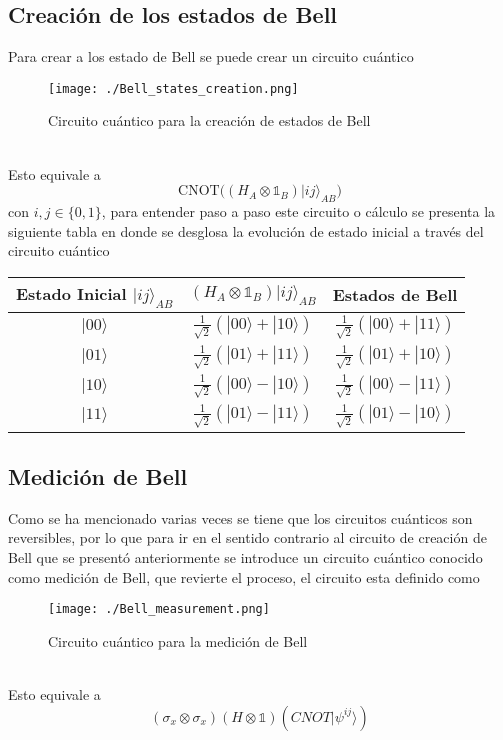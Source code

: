 \documentclass[a4paper]{article}
\begin{document}
\subsection{Creación de los estados de Bell}
Para crear a los estado de Bell se puede crear un circuito cuántico
\begin{figure}[h]
\begin{center}
\texttt{[image: ./Bell\_states\_creation.png]} 
\end{center} 
\caption{Circuito cuántico para la creación de estados de Bell}
\label{fig::NOT_gate}
\end{figure}\\
Esto equivale a 
\begin{equation}
\text{CNOT}\bigg((H_A\otimes\mathbb{1}_B)|ij\rangle_{AB} \bigg)
\end{equation}
con $i,j\in\{0,1\}$, para entender paso a paso este circuito o cálculo se presenta la siguiente tabla en donde se desglosa la evolución de estado inicial a través del circuito cuántico
\begin{center}
\begin{tabular}{ |c|c|c| } 
 \hline
 Estado Inicial $|ij\rangle_{AB} $ & $(H_A\otimes\mathbb{1}_B)|ij\rangle_{AB}$ & Estados de Bell \\ \hline
 $|00\rangle$  & $\frac{1}{\sqrt{2}}(|00\rangle+|10\rangle)$   &  $\frac{1}{\sqrt{2}}(|00\rangle+|11\rangle)$\\\hline
 $|01\rangle$  & $\frac{1}{\sqrt{2}}(|01\rangle+|11\rangle)$   &  $\frac{1}{\sqrt{2}}(|01\rangle+|10\rangle)$\\\hline
 $|10\rangle$  & $\frac{1}{\sqrt{2}}(|00\rangle-|10\rangle)$   &  $\frac{1}{\sqrt{2}}(|00\rangle-|11\rangle)$\\\hline
 $|11\rangle$  & $\frac{1}{\sqrt{2}}(|01\rangle-|11\rangle)$   &  $\frac{1}{\sqrt{2}}(|01\rangle-|10\rangle)$\\
 \hline
\end{tabular}
\end{center}
\subsection{Medición de Bell}
Como se ha mencionado varias veces se tiene que los circuitos cuánticos son reversibles, por lo que para ir en el sentido contrario al circuito de creación de Bell que se presentó anteriormente se introduce un circuito cuántico conocido como medición de Bell, que revierte el proceso, el circuito esta definido como 
\begin{figure}[h]
\begin{center}
\texttt{[image: ./Bell\_measurement.png]} 
\end{center} 
\caption{Circuito cuántico para la medición de Bell}
\label{fig::Bell_measurement}
\end{figure}\\
Esto equivale a 
\begin{equation}
(\sigma_x\otimes\sigma_x)(H\otimes\mathbb{1})(CNOT|\psi^{ij}\rangle)
\end{equation}
\end{document}
